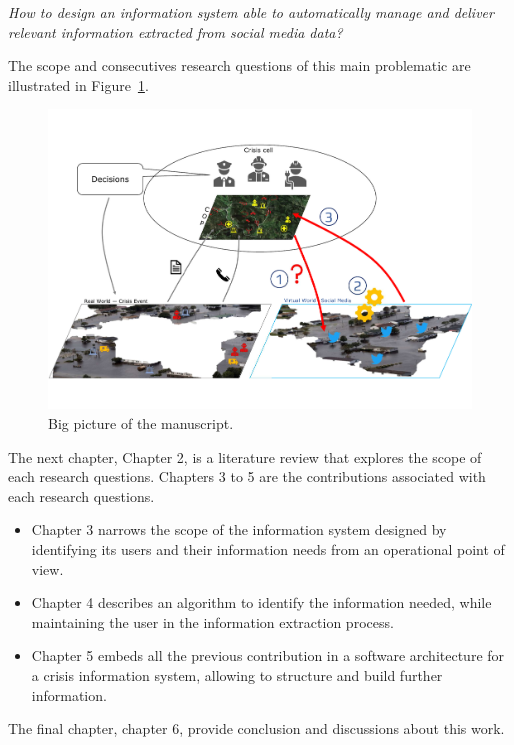 \emph{How to design an information system able to automatically manage and deliver relevant information extracted from social media data?}

The scope and consecutives research questions of this main problematic are illustrated in Figure~\ref{context:big-picture}.

\begin{landscape}
    \begin{figure}
        \includegraphics[width=\paperwidth,height=\paperheight,keepaspectratio]{figures/big-picture.pdf}
        \caption{Big picture of the manuscript.}
        \label{context:big-picture}
    \end{figure}
\end{landscape}

The next chapter, Chapter 2, is a literature review that explores the scope of each research questions.
Chapters 3 to 5 are the contributions associated with each research questions.

\begin{itemize}
    \item Chapter 3 narrows the scope of the information system designed by identifying its users and their information needs from an operational point of view.
    \item Chapter 4 describes an algorithm to identify the information needed, while maintaining the user in the information extraction process.
    \item Chapter 5 embeds all the previous contribution in a software architecture for a crisis information system, allowing to structure and build further information.
\end{itemize}

The final chapter, chapter 6, provide conclusion and discussions about this work.

